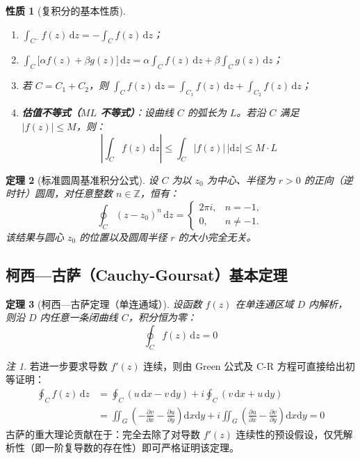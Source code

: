 \documentclass[11pt,a4paper,fontset=fandol]{ctexart}
\newtheorem{theorem}{定理}[section]
\newtheorem{property}[theorem]{性质}
\theoremstyle{remark}
\newtheorem{remark}{注}[section]
\begin{document}
\begin{property}[复积分的基本性质]
\begin{enumerate}
    \item $\int_{C^-} f(z)\,\mathrm{d}z = -\int_C f(z)\,\mathrm{d}z$；
    \item $\int_C \big[\alpha f(z) + \beta g(z)\big]\,\mathrm{d}z = \alpha \int_C f(z)\,\mathrm{d}z + \beta \int_C g(z)\,\mathrm{d}z$；
    \item 若 $C = C_1 + C_2$，则 $\int_C f(z)\,\mathrm{d}z = \int_{C_1} f(z)\,\mathrm{d}z + \int_{C_2} f(z)\,\mathrm{d}z$；
    \item \textbf{估值不等式（$ML$ 不等式）}：设曲线 $C$ 的弧长为 $L$。若沿 $C$ 满足 $|f(z)| \le M$，则：
    \begin{equation}
        \left| \int_C f(z)\,\mathrm{d}z \right| \le \int_C |f(z)|\,|\mathrm{d}z| \le M \cdot L
    \end{equation}
\end{enumerate}
\end{property}

\begin{theorem}[标准圆周基准积分公式]
设 $C$ 为以 $z_0$ 为中心、半径为 $r > 0$ 的正向（逆时针）圆周，对任意整数 $n \in \mathbb{Z}$，恒有：
\begin{equation}
    \oint_C (z - z_0)^n\,\mathrm{d}z = \begin{cases}
        2\pi i, & n = -1, \\
        0, & n \neq -1.
    \end{cases}
\end{equation}
该结果与圆心 $z_0$ 的位置以及圆周半径 $r$ 的大小完全无关。
\end{theorem}

\subsection{柯西—古萨（Cauchy-Goursat）基本定理}

\begin{theorem}[柯西—古萨定理（单连通域）]
设函数 $f(z)$ 在单连通区域 $D$ 内解析，则沿 $D$ 内任意一条闭曲线 $C$，积分恒为零：
\begin{equation}
    \oint_C f(z)\,\mathrm{d}z = 0
\end{equation}
\end{theorem}

\begin{remark}
若进一步要求导数 $f'(z)$ 连续，则由 Green 公式及 C-R 方程可直接给出初等证明：
\begin{align}
    \oint_C f(z)\,\mathrm{d}z &= \oint_C (u\,\mathrm{d}x - v\,\mathrm{d}y) + i \oint_C (v\,\mathrm{d}x + u\,\mathrm{d}y) \\
    &= \iint_G \left(-\frac{\partial v}{\partial x} - \frac{\partial u}{\partial y}\right)\mathrm{d}x\mathrm{d}y + i \iint_G \left(\frac{\partial u}{\partial x} - \frac{\partial v}{\partial y}\right)\mathrm{d}x\mathrm{d}y = 0
\end{align}
古萨的重大理论贡献在于：完全去除了对导数 $f'(z)$ 连续性的预设假设，仅凭解析性（即一阶复导数的存在性）即可严格证明该定理。
\end{remark}
\end{document}

